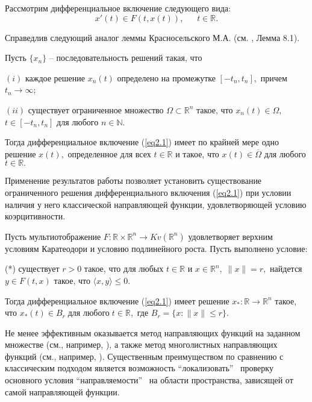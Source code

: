 Рассмотрим диф\-ференциальное включение следующего вида:
\begin{equation}
\label{eq2.1}
x'(t)\in F(t,x(t)),\quad\;\;t\in\mathbb{R}.
\end{equation}

Справедлив следующий аналог леммы Красносельского М.А. (см. \cite{k_kr}, Лемма 8.1).

\begin{lemma}
Пусть $\{x_n\}$ -- последовательность решений  такая, что

$(i)$  каждое решение $x_n(t)$ определено на промежутке $[-t_n, t_n],$ причем $t_n\to \infty$;

$(ii)$ существует ограниченное множество $\Omega\subset \mathbb{R}^n$ такое, что $x_n(t)\in\Omega,$ $t\in[-t_n,t_n]$ для любого $n\in \mathbb{N}.$

Тогда дифференциальное включение (\ref{eq2.1}) имеет по крайней мере одно решение $x(t),$ определенное для всех $t\in \mathbb{R}$ и такое, что $x(t)\in\overline{\Omega}$ для любого $t\in \mathbb{R}.$
\end{lemma}

Применение результатов работы \cite{o_k_k} позволяет установить существование ограниченного решения диф\-ференциального включения (\ref{eq2.1}) при условии наличия у него классической направляющей функции, удовлетворяющей условию коэрцитивности.

\begin{theorem}
Пусть мультиотображение $F:\mathbb{R} \times \mathbb{R}^n \to Kv(\mathbb{R}^n)$ удовлетворяет верхним условиям Каратеодори и условию подлинейного роста. Пусть выполнено условие:

(*) существует $r>0$ такое, что для любых $t\in \mathbb{R}$ и $x \in \mathbb{R}^n, \; \|x\|=r,$ найдется $y\in F(t,x)$ такое, что
$
\langle x, y \rangle\leq 0.
$

Тогда дифференциальное включение (\ref{eq2.1}) имеет решение $x_*:\mathbb{R}\to \mathbb{R}^n$ такое, что
$
x_*(t)\in B_r \;\mbox{для любого} \; t\in\mathbb{R},
$
где $B_r=\{x:\|x\|\leq r\}.$
\end{theorem}

Не менее эффективным оказывается метод направляющих функций на заданном множестве (см., например, \cite{k_k_o}), а также метод многолистных направляющих функций (см., например, \cite{k_k_o_z_2}). Существенным преимуществом по сравнению с классическим подходом является возможность ``локализовать'' $\,$ проверку основного условия ``направляемости'' $\,$ на области пространства, зависящей от самой направляющей функции.


